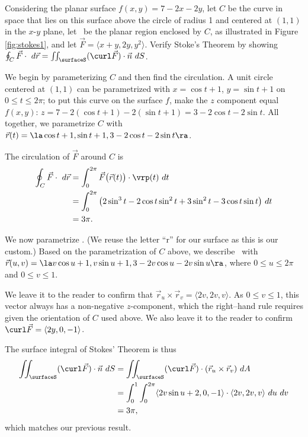 {Considering the planar surface $f(x,y) = 7-2x-2y$, let $C$ be the curve in space that lies on this surface above the circle of radius 1 and centered at $(1,1)$ in the $x$-$y$ plane, let \surfaceS\ be the planar region enclosed by $C$, as illustrated in Figure \ref{fig:stokes1}, and let $\vec F = \langle x+y,2y, y^2\rangle$. Verify Stoke's Theorem by showing $\oint_C \vec F\cdot \ d\vec r = \iint_\surfaceS (\curl\vec F)\cdot \vec n\ dS$.
}
{We begin by parameterizing $C$ and then find the circulation. A unit circle centered at $(1,1)$ can be parametrized with $x=\cos t+1$, $y=\sin t+1$ on $0\leq t\leq 2\pi$; to put this curve on the surface $f$, make the $z$ component equal $f(x,y)$: $z = 7-2(\cos t+1)-2(\sin t+1)  = 3-2\cos t - 2\sin t$. All together, we parametrize $C$ with $\vec r(t) = \la \cos t+1, \sin t+1, 3-2\cos t-2\sin t\ra$. 

The circulation of $\vec F$ around $C$ is
\begin{align*}
\oint_C\vec F\cdot \ d\vec r &= \int_0^{2\pi}\vec F\big(\vec r(t)\big)\cdot \vrp(t)\ dt \\%
	&= \int_0^{2\pi}\big(2\sin^3t-2\cos t\sin^2t+3\sin^2t-3\cos t\sin t\big)\ dt \\
	&= 3\pi.
	\end{align*}

We now parametrize \surfaceS. (We reuse the letter ``r'' for our surface as this is our custom.) Based on the parametrization of $C$ above, we describe \surfaceS\ with $\vec r(u,v) = \la v\cos u+1, v\sin u+1, 3-2v\cos u-2v\sin u\ra$, where $0\leq u\leq 2\pi$ and $0\leq v\leq 1$. 

We leave it to the reader to confirm that $\vec r_u\times \vec r_v = \langle 2v,2v,v\rangle$. As $0\leq v\leq 1$, this vector always has a non-negative $z$-component, which the right--hand rule requires given the orientation of $C$ used above. We also leave it to the reader to confirm $\curl\vec F = \langle 2y,0,-1\rangle$.

The surface integral of Stokes' Theorem is thus
\begin{align*}
\iint_\surfaceS (\curl\vec F)\cdot \vec n\ dS &= \iint_\surfaceS (\curl\vec F)\cdot (\vec r_u\times \vec r_v)\ dA \\
	&= \int_0^1\int_0^{2\pi} \langle 2v\sin u+2,0,-1\rangle\cdot\langle 2v,2v,v\rangle\ du\ dv\\
	&= 3\pi,
\end{align*}
which matches our previous result.
}\\

